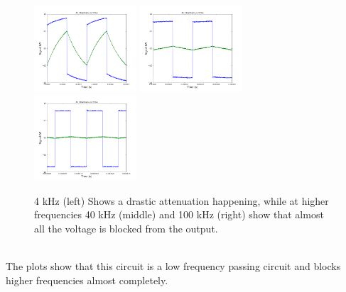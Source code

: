 \documentclass[a4paper,12pt]{article}
\begin{document}
\begin{figure}[h]
\centering
\includegraphics[width=1.5in]{sam_lab2/2g_4kHz.png}
\includegraphics[width=1.5in]{sam_lab2/2g_40kHz.png}
\includegraphics[width=1.5in]{sam_lab2/2g_100kHz.png}
\caption{4 kHz (left) Shows a drastic attenuation happening, while at higher frequencies 40 kHz (middle) and 100 kHz (right) show that almost all the voltage is blocked from the output.}
\end{figure}\\
The plots show that this circuit is a low frequency passing circuit and blocks higher frequencies almost completely.
\newpage
\end{document}
